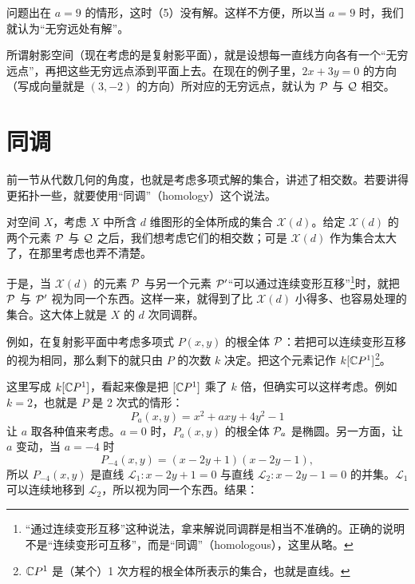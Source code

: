 问题出在 $a = 9$ 的情形，这时（5）没有解。这样不方便，所以当 $a = 9$ 时，我们就认为“无穷远处有解”。

所谓射影空间（现在考虑的是复射影平面），就是设想每一直线方向各有一个“无穷远点”，再把这些无穷远点添到平面上去。在现在的例子里，$2x + 3y = 0$ 的方向（写成向量就是 $(3,-2)$ 的方向）所对应的无穷远点，就认为 $\mathcal{P}$ 与 $\mathcal{Q}$ 相交。


\section{同调}

前一节从代数几何的角度，也就是考虑多项式解的集合，讲述了相交数。若要讲得更拓扑一些，就要使用“同调”（homology）这个说法。

对空间 $X$，考虑 $X$ 中所含 $d$ 维图形的全体所成的集合 $\mathcal{X}(d)$。给定 $\mathcal{X}(d)$ 的两个元素 $\mathcal{P}$ 与 $\mathcal{Q}$ 之后，我们想考虑它们的相交数；可是 $\mathcal{X}(d)$ 作为集合太大了，在那里考虑也弄不清楚。

于是，当 $\mathcal{X}(d)$ 的元素 $\mathcal{P}$ 与另一个元素 $\mathcal{P}'$“可以通过连续变形互移”\footnote{“通过连续变形互移”这种说法，拿来解说同调群是相当不准确的。正确的说明不是“连续变形可互移”，而是“同调”（homologous），这里从略。}时，就把 $\mathcal{P}$ 与 $\mathcal{P}'$ 视为同一个东西。这样一来，就得到了比 $\mathcal{X}(d)$ 小得多、也容易处理的集合。这大体上就是 $X$ 的 $d$ 次同调群。

例如，在复射影平面中考虑多项式 $P(x,y)$ 的根全体 $\mathcal{P}$：若把可以连续变形互移的视为相同，那么剩下的就只由 $P$ 的次数 $k$ 决定。把这个元素记作 $k[\mathbb{C}P^1]$\footnote{$\mathbb{C}P^1$ 是（某个）1 次方程的根全体所表示的集合，也就是直线。}。

这里写成 $k[\mathbb{C}P^1]$，看起来像是把 $[\mathbb{C}P^1]$ 乘了 $k$ 倍，但确实可以这样考虑。例如 $k=2$，也就是 $P$ 是 2 次式的情形：
\[
P_a(x,y) = x^2 + axy + 4y^2 - 1
\]
让 $a$ 取各种值来考虑。$a=0$ 时，$P_a(x,y)$ 的根全体 $\mathcal{P}_a$ 是椭圆。另一方面，让 $a$ 变动，当 $a=-4$ 时
\[
P_{-4}(x,y) = (x-2y+1)(x-2y-1),
\]
所以 $P_{-4}(x,y)$ 是直线 $\mathcal{L}_1 : x-2y+1=0$ 与直线 $\mathcal{L}_2 : x-2y-1=0$ 的并集。$\mathcal{L}_1$ 可以连续地移到 $\mathcal{L}_2$，所以视为同一个东西。结果：

